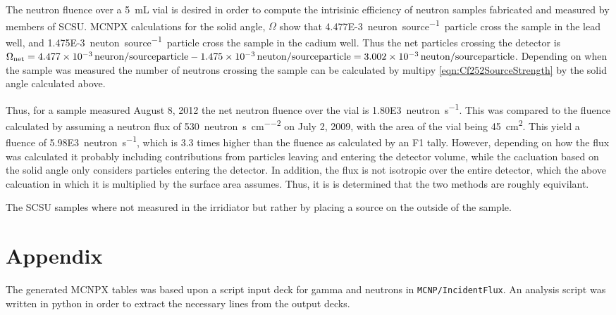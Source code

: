 \documentclass[draftcls,onecolumn]{IEEEtran}
\begin{document}
\begin{Exercise*}[label={LiquidSample},title={Liquid Sample},name={Example}]
The neutron fluence over a \SI{5}{\milli\liter} vial is desired in order to compute the intrisinic efficiency of neutron samples fabricated and measured by members of SCSU.
MCNPX calculations for the solid angle, $\Omega$ show that \SI{4.477E-3}{neuron\per source particle} cross the sample in the lead well, and \SI{1.475E-3}{neuton\per source particle} cross the sample in the cadium well.
Thus the net particles crossing the detector is $\Omega_{\text{net}} =\SI{4.477E-3}{neuron\per source particle} - \SI{1.475E-3}{neuton\per source particle} =\SI{3.002E-3}{neuton\per source particle} $.
Depending on when the sample was measured the number of neutrons crossing the sample can be calculated by multipy \eqref{eqn:Cf252SourceStrength} by the solid angle calculated above.

Thus, for a sample measured August 8, 2012 the net neutron fluence over the vial is  \SI{1.80E3}{neutron\per\second}.
This was compared to the fluence calculated by assuming a neutron flux of \SI{530}{neutron\per\second\per\cm\squared} on July 2, 2009, with the area of the vial being \SI{45}{\cm\squared}.
This yield a fluence of \SI{5.98E3}{neutron\per\second}, which is 3.3 times higher than the fluence as calculated by an F1 tally.
However, depending on how the flux was calculated it probably including contributions from particles leaving and entering the detector volume, while the cacluation based on the solid angle only considers particles entering the detector.
In addition, the flux is not isotropic over the entire detector, which the above calcuation in which it is multiplied by the surface area assumes.
Thus, it is is determined that the two methods are roughly equivilant.


The SCSU samples where not measured in the  irridiator but rather by placing a source on the outside of the sample.

\end{Exercise*}



\section{Appendix}
The generated MCNPX tables was based upon a script input deck for gamma and neutrons in \verb+MCNP/IncidentFlux+.
An analysis script was written in python in order to extract the necessary lines from the output decks.
\end{document}
